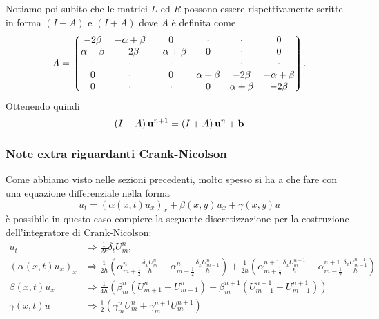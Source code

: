 \documentclass[10pt,a4paper]{article}
\begin{document}
Notiamo poi subito che le matrici $L$ ed $R$ possono essere rispettivamente scritte in forma $(I-A)$ e $(I+A)$ dove $A$ è definita come
\begin{equation}
	A = \mqty*(-2\beta & -\alpha + \beta & 0 & \cdot & \cdot & 0 \\ \alpha +\beta & -2\beta & -\alpha+\beta & 0 & \cdot & 0 \\ \cdot & \cdot & \cdot & \cdot & \cdot & \cdot \\ 0 & \cdot & 0 & \alpha +\beta & -2\beta & -\alpha+\beta \\ 0 & \cdot & \cdot & 0 & \alpha+\beta & -2\beta). 
\end{equation}
Ottenendo quindi
\begin{equation}
	\left(I-A\right)\vb{u}^{n+1} = \left(I+A\right)\vb{u}^n + \vb{b}
\end{equation}

\subsubsection{Note extra riguardanti Crank-Nicolson}
Come abbiamo visto nelle sezioni precedenti, molto spesso si ha a che fare con una equazione differenziale nella forma
\begin{equation}
	u_t = {(\alpha(x,t)u_x)}_x + \beta(x,y)u_x + \gamma(x,y)u
\end{equation}
è possibile in questo caso compiere la seguente discretizzazione per la costruzione dell'integratore di Crank-Nicolson:
\begin{align}
	u_t &\Rightarrow \frac{1}{2k}\delta_t U_m^n,\\
	{(\alpha(x,t)u_x)}_x &\Rightarrow \frac{1}{2h}\left(\alpha_{m+\frac{1}{2}}^n \frac{\delta_x U_m^n}{h} - \alpha_{m-\frac{1}{2}}^n \frac{\delta_x U_{m-1}^n}{h}\right) + \frac{1}{2h}\left(\alpha_{m+\frac{1}{2}}^{n+1} \frac{\delta_x U_m^{n+1}}{h} - \alpha_{m-\frac{1}{2}}^{n+1} \frac{\delta_x U_{m-1}^{n+1}}{h}\right)\\
	\beta(x,t)u_x &\Rightarrow \frac{1}{4h}(\beta_m^n(U_{m+1}^n - U_{m-1}^n) + \beta_m^{n+1}(U_{m+1}^{n+1} - U_{m-1}^{n+1}))\\
	\gamma(x,t)u &\Rightarrow \frac{1}{2}(\gamma_m^n U_m^n + \gamma_m^{n+1} U_m^{n+1})
\end{align}

\end{document}
